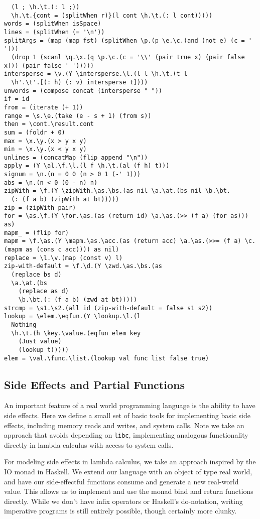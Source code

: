 \begin{verbatim}
  (l ; \h.\t.(: l ;))
  \h.\t.{cont = (splitWhen r)}(l cont \h.\t.(: l cont)))))
words = (splitWhen isSpace)
lines = (splitWhen (= '\n'))
splitArgs = (map (map fst) (splitWhen \p.(p \e.\c.(and (not e) (c = ' '))) 
  (drop 1 (scanl \q.\x.(q \p.\c.(c = '\\' (pair true x) (pair false x))) (pair false ' ')))))
intersperse = \v.(Y \intersperse.\l.(l l \h.\t.(t l 
  \h'.\t'.[(: h) (: v) intersperse t])))
unwords = (compose concat (intersperse " "))
if = id
from = (iterate (+ 1))
range = \s.\e.(take (e - s + 1) (from s))
then = \cont.\result.cont
sum = (foldr + 0)
max = \x.\y.(x > y x y)
min = \x.\y.(x < y x y)
unlines = (concatMap (flip append "\n"))
apply = (Y \al.\f.\l.(l f \h.\t.(al (f h) t))) 
signum = \n.(n = 0 0 (n > 0 1 (-' 1)))
abs = \n.(n < 0 (0 - n) n)
zipWith = \f.(Y \zipWith.\as.\bs.(as nil \a.\at.(bs nil \b.\bt.
  (: (f a b) (zipWith at bt)))))
zip = (zipWith pair)
for = \as.\f.(Y \for.\as.(as (return id) \a.\as.(>> (f a) (for as))) as)
mapm_ = (flip for)
mapm = \f.\as.(Y \mapm.\as.\acc.(as (return acc) \a.\as.(>>= (f a) \c.(mapm as (cons c acc)))) as nil)
replace = \l.\v.(map (const v) l)
zip-with-default = \f.\d.(Y \zwd.\as.\bs.(as 
  (replace bs d)
  \a.\at.(bs 
    (replace as d)
    \b.\bt.(: (f a b) (zwd at bt)))))
strcmp = \s1.\s2.(all id (zip-with-default = false s1 s2))
lookup = \elem.\eqfun.(Y \lookup.\l.(l 
  Nothing 
  \h.\t.(h \key.\value.(eqfun elem key
    (Just value)
    (lookup t)))))
elem = \val.\func.\list.(lookup val func list false true)
\end{verbatim}

\subsection{Side Effects and Partial Functions}
An important feature of a real world programming language is the ability to have
side effects. Here we define a small set of basic tools for implementing basic
side effects, including memory reads and writes, and system calls. Note we take
an approach that avoids depending on \texttt{libc}, implementing analogous
functionality directly in lambda calculus with access to system calls. 

For modeling side effects in lambda calculus, we take an approach inspired by
the IO monad in Haskell. We extend our language with an object of type real
world, and have our side-effectful functions consume and generate a new
real-world value. This allows us to implement and use the monad bind and return
functions directly. While we don't have infix operators or Haskell's
do-notation, writing imperative programs is still entirely possible, though
certainly more clunky. 

